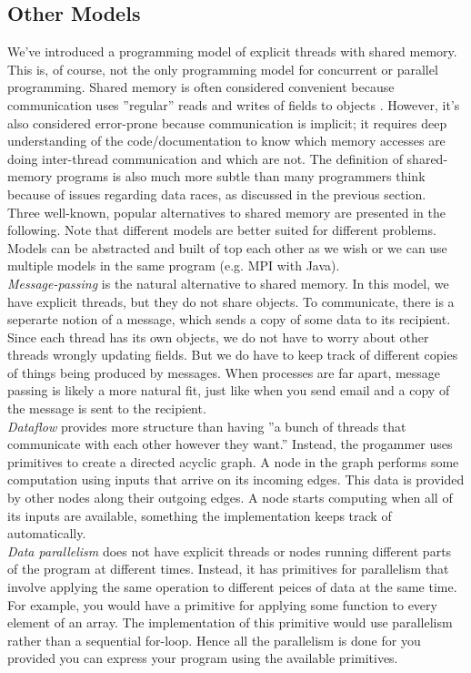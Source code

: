 \documentclass[main]{subfiles}
\begin{document}
\subsection{Other Models}
We've introduced a programming model of explicit threads with shared memory. This is, of course, not the only programming model for concurrent or parallel programming. Shared memory is often considered convenient because communication uses ''regular'' reads and writes of fields to objects . However, it's also considered error-prone because communication is implicit; it requires deep understanding of the code/documentation to know which memory accesses are doing inter-thread communication and which are not. The definition of shared-memory programs is also much more subtle than many programmers think because of issues regarding data races, as discussed in the previous section.\\[3mm]
Three well-known, popular alternatives to shared memory are presented in the following. Note that different models are better suited for different problems. Models can be abstracted and built of top each other as we wish or we can use multiple models in the same program (e.g. MPI with Java).\\[3mm]
\textit{Message-passing} is the natural alternative to shared memory. In this model, we have explicit threads, but they do not share objects. To communicate, there is a seperarte notion of a message, which sends a copy of some data to its recipient. Since each thread has its own objects, we do not have to worry about other threads wrongly updating fields. But we do have to keep track of different copies of things being produced by messages. When processes are far apart, message passing is likely a more natural fit, just like when you send email and a copy of the message is sent to the recipient.\\[3mm]
\textit{Dataflow} provides more structure than having ''a bunch of threads that communicate with each other however they want.'' Instead, the progammer uses primitives to create a directed acyclic graph. A node in the graph performs some computation using inputs that arrive on its incoming edges. This data is provided by other nodes along their outgoing edges. A node starts computing when all of its inputs are available, something the implementation keeps track of automatically.\\[3mm]
\textit{Data parallelism} does not have explicit threads or nodes running different parts of the program at different times. Instead, it has primitives for parallelism that involve applying the same operation to different peices of data at the same time. For example, you would have a primitive for applying some function to every element of an array. The implementation of this primitive would use parallelism rather than a sequential for-loop. Hence all the parallelism is done for you provided you can express your program using the available primitives.
\end{document}
